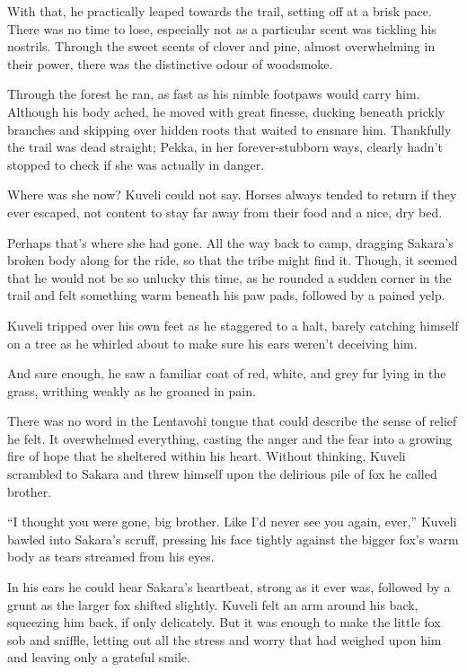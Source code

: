 With that, he practically leaped towards the trail, setting off at a brisk pace. There was no time to lose, especially not as a particular scent was tickling his nostrils. Through the sweet scents of clover and pine, almost overwhelming in their power, there was the distinctive odour of woodsmoke.

Through the forest he ran, as fast as his nimble footpaws would carry him. Although his body ached, he moved with great finesse, ducking beneath prickly branches and skipping over hidden roots that waited to ensnare him. Thankfully the trail was dead straight; Pekka, in her forever-stubborn ways, clearly hadn't stopped to check if she was actually in danger.

Where was she now? Kuveli could not say. Horses always tended to return if they ever escaped, not content to stay far away from their food and a nice, dry bed.

Perhaps that's where she had gone. All the way back to camp, dragging Sakara's broken body along for the ride, so that the tribe might find it. Though, it seemed that he would not be so unlucky this time, as he rounded a sudden corner in the trail and felt something warm beneath his paw pads, followed by a pained yelp.

Kuveli tripped over his own feet as he staggered to a halt, barely catching himself on a tree as he whirled about to make sure his ears weren't deceiving him.

And sure enough, he saw a familiar coat of red, white, and grey fur lying in the grass, writhing weakly as he groaned in pain.

There was no word in the Lentavohi tongue that could describe the sense of relief he felt. It overwhelmed everything, casting the anger and the fear into a growing fire of hope that he sheltered within his heart. Without thinking, Kuveli scrambled to Sakara and threw himself upon the delirious pile of fox he called brother.

``I thought you were gone, big brother. Like I'd never see you again, ever,'' Kuveli bawled into Sakara's scruff, pressing his face tightly against the bigger fox's warm body as tears streamed from his eyes.

In his ears he could hear Sakara's heartbeat, strong as it ever was, followed by a grunt as the larger fox shifted slightly. Kuveli felt an arm around his back, squeezing him back, if only delicately. But it was enough to make the little fox sob and sniffle, letting out all the stress and worry that had weighed upon him and leaving only a grateful smile.

